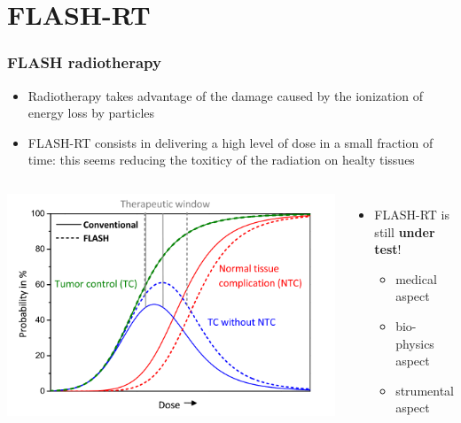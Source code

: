 \section{FLASH-RT}

    \begin{frame}
        \frametitle{FLASH radiotherapy}
        \begin{itemize}
            \item Radiotherapy takes advantage of the damage caused by the ionization of energy loss by particles
            \item FLASH-RT consists in delivering a high level of dose in a small fraction of time: this seems reducing the toxiticy of the radiation on healty tissues
        \end{itemize}
        \medskip
        \begin{columns}
                \includegraphics[width=1.25\linewidth]{figures/pixel_detectors_usage/curve_flash.png}
            
            \begin{itemize}
                \item FLASH-RT is still \textbf{under test}!
                \begin{itemize}
                    \item medical aspect%
                    \item  bio-physics aspect%
                    \item  strumental aspect%
                \end{itemize}
            \end{itemize}
        \end{columns}
    \end{frame} 


